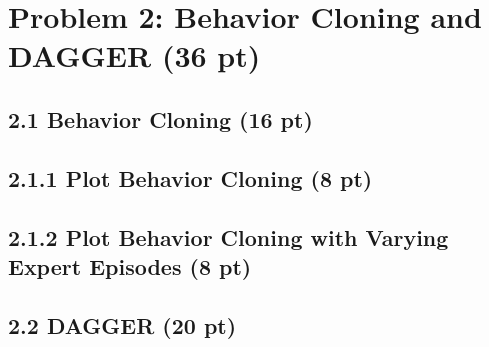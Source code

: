 \documentclass[12pt]{article}
\begin{document}
\newpage
\section*{Problem 2: Behavior Cloning and DAGGER (36 pt)}
\subsection*{2.1 Behavior Cloning (16 pt)}

\subsection*{2.1.1 Plot Behavior Cloning (8 pt)}
\begin{tcolorbox}[fit,height=20em, width=40em, blank, borderline={1pt}{1pt},nobeforeafter]
            \begin{center}
            \end{center}
            \end{tcolorbox}
            
\subsection*{2.1.2 Plot Behavior Cloning with Varying Expert Episodes (8 pt)}

\begin{tcolorbox}[fit,height=24em, width=40em, blank, borderline={1pt}{1pt},nobeforeafter]
            \begin{center}

\end{center}
\end{tcolorbox}


\subsection*{2.2 DAGGER (20 pt)}
\end{document}
